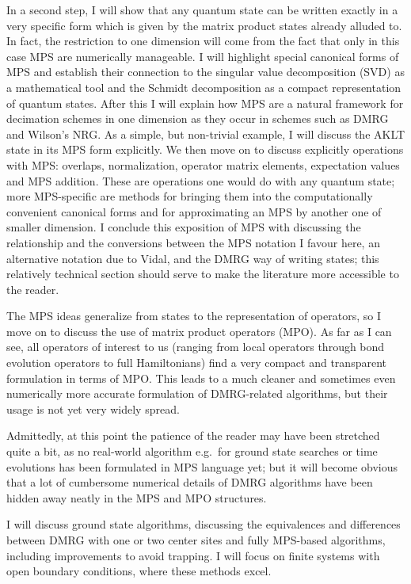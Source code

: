 \documentclass[a4paper,10pt,oneside,onecolumn,1p,times]{elsarticle}
\begin{document}
In a second step, I will show that any quantum state can be written exactly in a very specific form which is given by the matrix product states already alluded to. In fact, the restriction to one dimension will come from the fact that only in this case MPS are numerically manageable. I will highlight special canonical forms of MPS and establish their connection to the singular value decomposition (SVD) as a mathematical tool and the Schmidt decomposition as a compact representation of quantum states. After this I will explain how MPS are a natural framework for decimation schemes in one dimension as they occur in schemes such as DMRG and Wilson's NRG. As a simple, but non-trivial example, I will discuss the AKLT state in its MPS form explicitly.
We then move on to discuss explicitly operations with MPS: overlaps, normalization, operator matrix elements, expectation values and MPS addition. These are operations one would do with any quantum state; more MPS-specific are methods for bringing them into the computationally convenient canonical forms and for approximating an MPS by another one of smaller dimension. I conclude this exposition of MPS with discussing the relationship and the conversions between the MPS notation I favour here, an alternative notation due to Vidal, and the DMRG way of writing states; this relatively technical section should serve to make the literature more accessible to the reader.

The MPS ideas generalize from states to the representation of operators, so I move on to discuss the use of matrix product operators (MPO)\cite{VerstraeteRipoll04,McCulloch07,VerstraetePirvu08,Crosswhite08,Frowis10}. As far as I can see, all operators of interest to us (ranging from local operators through bond evolution operators to full Hamiltonians) find a very compact and transparent formulation in terms of MPO. This leads to a much cleaner and sometimes even numerically more accurate formulation of DMRG-related algorithms, but their usage is not yet very widely spread.

Admittedly, at this point the patience of the reader may have been stretched quite a bit, as no real-world algorithm e.g.\ for ground state searches or time evolutions has been formulated in MPS language yet; but it will become obvious that a lot of cumbersome numerical details of DMRG algorithms have been hidden away neatly in the MPS and MPO structures. 

I will discuss ground state algorithms, discussing the equivalences and differences between DMRG with one or two center sites and fully MPS-based algorithms, including improvements to avoid trapping. I will focus on finite systems with open boundary conditions, where these methods excel.
\end{document}
